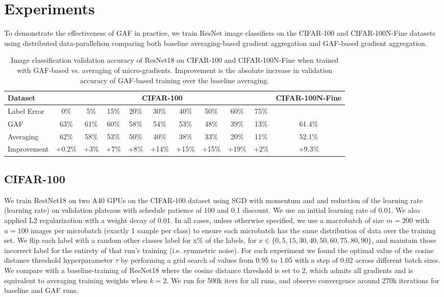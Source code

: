 \section{Experiments}
\label{sec:experiments}

To demonstrate the effectiveness of GAF in practice, we train ResNet image classifiers on the CIFAR-100 and CIFAR-100N-Fine datasets using distributed data-parallelism comparing both baseline averaging-based gradient aggregation and GAF-based gradient aggregation. 

\begin{table}[ht!]
\centering
\begin{tabular}{@{}lcccccccccc@{}}
\toprule
Dataset & \multicolumn{9}{c}{CIFAR-100} & CIFAR-100N-Fine \\
\midrule
Label Error & 0\% & 5\% & 15\% & 20\% & 30\% & 40\% & 50\% & 60\% & 75\% &  \\
\midrule
GAF & 63\% & 61\% & 60\% & 58\% & 54\% & 53\% & 48\% & 39\% & 13\% & 61.4\%  \\
Averaging & 62\% & 58\% & 53\% & 50\% & 40\% & 38\% & 33\% & 20\% & 11\% & 52.1\% \\
\bottomrule
Improvement & +0.2\% & +3\% & +7\% & +8\% & +14\% & +15\% & +15\% & +19\% & +2\% & +9.3\% \\
\bottomrule
\end{tabular}%
\caption{Image classification validation accuracy of ResNet18 on CIFAR-100 and CIFAR-100N-Fine when trained with GAF-based vs. averaging of micro-gradients. Improvement is the absolute increase in validation accuracy of GAF-based training over the baseline averaging.}
\end{table}

\subsection{CIFAR-100}

We train RestNet18 on two A40 GPUs on the CIFAR-100 dataset using SGD with momentum and and reduction of the learning rate (learning rate) on validation plateaus with schedule patience of 100 and 0.1 discount. We use an initial learning rate of 0.01. We also applied L2 regularization with a weight decay of 0.01. In all cases, unless otherwise specified, we use a macrobatch of size $m = 200$ with $u = 100$ images per microbatch (exactly 1 sample per class) to ensure each microbatch has the same distribution of data over the training set. We flip each label with a random other classes label for x\% of the labels, for $ x \in \{0,5,15,30,40,50,60,75,80,90\}$, and maintain those incorrect label for the entirety of that run's training (i.e. symmetric noise). For each experiment we found the optimal value of the cosine distance threshold hyperparameter $\tau$ by performing a grid search of values from 0.95 to 1.05 with a step of 0.02 across different batch sizes. We compare with a baseline-training of ResNet18 where the cosine distance threshold is set to 2, which admits all gradients and is equivalent to averaging training weights when $k = 2$. We run for 500k iters for all runs, and observe convergence around 270k iterations for baseline and GAF runs. 

